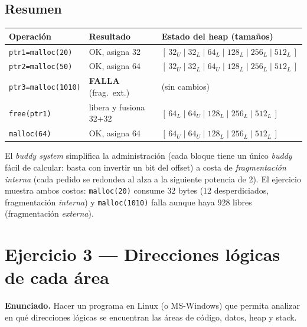 \documentclass[11pt,a4paper]{article}
\begin{document}
\subsection*{Resumen}

\begin{center}
\small
\begin{tabular}{@{}lll@{}}
\toprule
Operación & Resultado & Estado del heap (tamaños) \\
\midrule
\texttt{ptr1=malloc(20)}   & OK, asigna 32                & $[\,32_U \mid 32_L \mid 64_L \mid 128_L \mid 256_L \mid 512_L\,]$ \\
\texttt{ptr2=malloc(50)}   & OK, asigna 64                & $[\,32_U \mid 32_L \mid 64_U \mid 128_L \mid 256_L \mid 512_L\,]$ \\
\texttt{ptr3=malloc(1010)} & \textbf{FALLA} (frag.\ ext.) & (sin cambios) \\
\texttt{free(ptr1)}        & libera y fusiona 32+32       & $[\,64_L \mid 64_U \mid 128_L \mid 256_L \mid 512_L\,]$ \\
\texttt{malloc(64)}        & OK, asigna 64                & $[\,64_U \mid 64_U \mid 128_L \mid 256_L \mid 512_L\,]$ \\
\bottomrule
\end{tabular}
\end{center}

\begin{idea}
El \emph{buddy system} simplifica la administración (cada bloque tiene
un único \emph{buddy} fácil de calcular: basta con invertir un bit del
offset) a costa de \emph{fragmentación interna} (cada pedido se
redondea al alza a la siguiente potencia de 2). El ejercicio muestra
ambos costos: \texttt{malloc(20)} consume $32$ bytes (12 desperdiciados,
fragmentación \emph{interna}) y \texttt{malloc(1010)} falla aunque haya
$928$ libres (fragmentación \emph{externa}).
\end{idea}

\section{Ejercicio 3 --- Direcciones lógicas de cada área}

\textbf{Enunciado.} Hacer un programa en Linux (o MS-Windows) que
permita analizar en qué direcciones lógicas se encuentran las áreas de
código, datos, heap y stack.
\end{document}
